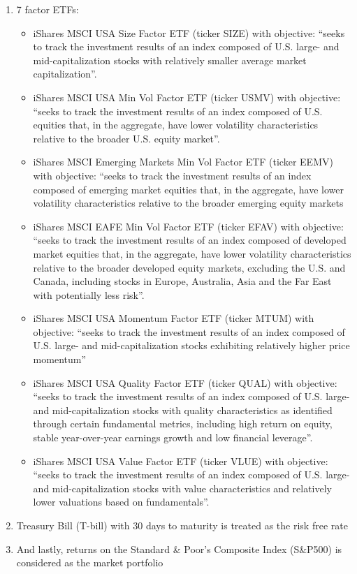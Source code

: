 \begin{enumerate}[label=(\alph*)]
\item 7 factor ETFs:
\begin{itemize}
\item iShares MSCI USA Size Factor ETF (ticker SIZE) with objective: “seeks to track the investment results of an index composed of U.S. large- and mid-capitalization stocks with relatively smaller average market capitalization”.
\item iShares MSCI USA Min Vol Factor ETF (ticker USMV) with objective: “seeks to track the investment results of an index composed of U.S. equities that, in the aggregate, have lower volatility characteristics relative to the broader U.S. equity market”.
\item iShares MSCI Emerging Markets Min Vol Factor ETF (ticker EEMV) with objective: “seeks to track the investment results of an index composed of emerging market equities that, in the aggregate, have lower volatility characteristics relative to the broader emerging equity markets
\item iShares MSCI EAFE Min Vol Factor ETF (ticker EFAV) with objective: “seeks to track the investment results of an index composed of developed market equities that, in the aggregate, have lower volatility characteristics relative to the broader developed equity markets, excluding the U.S. and Canada, including stocks in Europe, Australia, Asia and the Far East with potentially less risk”.
\item iShares MSCI USA Momentum Factor ETF (ticker MTUM) with objective: “seeks to track the investment results of an index composed of U.S. large- and mid-capitalization stocks exhibiting relatively higher price momentum”
\item iShares MSCI USA Quality Factor ETF (ticker QUAL) with objective: “seeks to track the investment results of an index composed of U.S. large- and mid-capitalization stocks with quality characteristics as identified through certain fundamental metrics, including high return on equity, stable year-over-year earnings growth and low financial leverage”.
\item iShares MSCI USA Value Factor ETF (ticker VLUE) with objective: “seeks to track the investment results of an index composed of U.S. large- and mid-capitalization stocks with value characteristics and relatively lower valuations based on fundamentals”.
	\end{itemize}

\item Treasury Bill (T-bill) with 30 days to maturity is treated as the risk free rate

\item And lastly, returns on the Standard & Poor's Composite Index (S&P500) is considered as the market portfolio

\end{enumerate}



